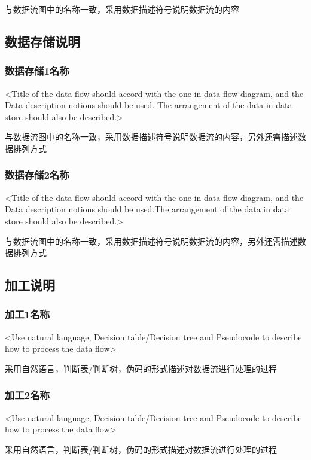 与数据流图中的名称一致，采用数据描述符号说明数据流的内容

\subsection{数据存储说明}
\subsubsection{数据存储1名称}
<Title of  the data flow should accord with the one in data flow diagram, and the Data description notions should be used. The arrangement of the data in data store should also be described.>

与数据流图中的名称一致，采用数据描述符号说明数据流的内容，另外还需描述数据排列方式

\subsubsection{数据存储2名称}
<Title of  the data flow should accord with the one in data flow diagram, and the Data description notions should be used.The arrangement of the data in data store should also be described.>

与数据流图中的名称一致，采用数据描述符号说明数据流的内容，另外还需描述数据排列方式

\subsection{加工说明}
\subsubsection{加工1名称}
<Use natural language, Decision table/Decision tree and Pseudocode to describe how to process the data flow>

采用自然语言，判断表/判断树，伪码的形式描述对数据流进行处理的过程

\subsubsection{加工2名称}
<Use natural language, Decision table/Decision tree and Pseudocode to describe how to process the data flow>

采用自然语言，判断表/判断树，伪码的形式描述对数据流进行处理的过程
